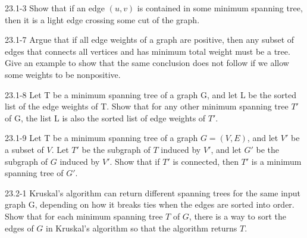 




\homeworkheader{\classnameandsection}

\begin{problem}{23.1-3}
  Show that if an edge $(u,v)$ is contained in some minimum spanning tree, then it is a light edge crossing some cut of
  the graph.
\end{problem}

\begin{problem}{23.1-7}
  Argue that if all edge weights of a graph are positive, then any subset of edges that connects all vertices and has
  minimum total weight must be a tree. Give an example to show that the same conclusion does not follow if we allow some
  weights to be nonpositive.
\end{problem}

\begin{problem}{23.1-8}
  Let T be a minimum spanning tree of a graph G, and let L be the sorted list of the edge weights of T. Show that for
  any other minimum spanning tree $T'$ of G, the list L is also the sorted list of edge weights of $T'$.
\end{problem}

\begin{problem}{23.1-9}
  Let T be a minimum spanning tree of a graph $G = (V,E)$, and let $V'$ be a subset of $V$. Let $T'$ be the subgraph of
  $T$ induced by $V'$, and let $G'$ be the subgraph of $G$ induced by $V'$. Show that if $T'$ is connected, then $T'$ is
  a minimum spanning tree of $G'$.
\end{problem}

\begin{problem}{23.2-1}
  Kruskal's algorithm can return different spanning trees for the same input graph G, depending on how it breaks ties
  when the edges are sorted into order. Show that for each minimum spanning tree $T$ of $G$, there is a way to sort the
  edges of $G$ in Kruskal's algorithm so that the algorithm returns $T$.
\end{problem}

